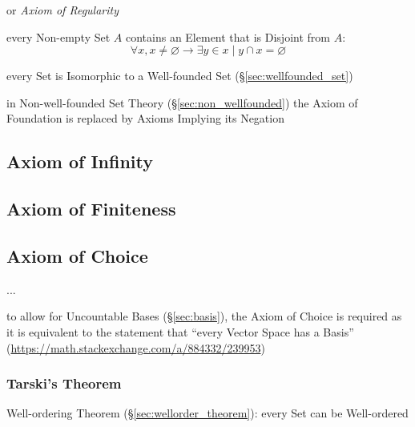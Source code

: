 or \emph{Axiom of Regularity}

every Non-empty Set $A$ contains an Element that is Disjoint from $A$:
\[
  \forall x, x \neq \varnothing \to \exists y \in x \mid y
  \cap x = \varnothing
\]

every Set is Isomorphic to a Well-founded Set
(\S\ref{sec:wellfounded_set})

in Non-well-founded Set Theory (\S\ref{sec:non_wellfounded}) the Axiom
of Foundation is replaced by Axioms Implying its Negation



\subsection{Axiom of Infinity}\label{sec:infinity_axiom}

\subsection{Axiom of Finiteness}\label{sec:finiteness_axiom}

\subsection{Axiom of Choice}\label{sec:choice_axiom}

...

\fist to allow for Uncountable Bases (\S\ref{sec:basis}), the Axiom of Choice is
required as it is equivalent to the statement that ``every Vector Space has a
Basis'' (\url{https://math.stackexchange.com/a/884332/239953})



\subsubsection{Tarski's Theorem}\label{sec:tarskis_theorem}

Well-ordering Theorem (\S\ref{sec:wellorder_theorem}): every Set can
be Well-ordered



